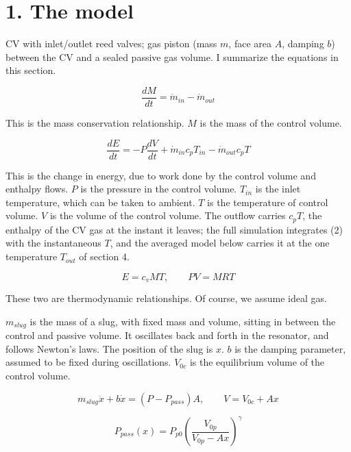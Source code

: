 \documentclass[11pt]{article}
\begin{document}
\section*{1. The model}

CV with inlet/outlet reed valves; gas piston (mass $m$, face area $A$, damping $b$) between the CV and a sealed passive gas volume. I summarize the equations in this section.

\begin{equation}
\frac{dM}{dt} = \dot{m}_{in} - \dot{m}_{out} \tag{1}
\end{equation}

This is the mass conservation relationship. $M$ is the mass of the control volume.

\begin{equation}
\frac{dE}{dt} = -P\frac{dV}{dt} + \dot{m}_{in}c_pT_{in} - \dot{m}_{out}c_pT \tag{2}
\end{equation}

This is the change in energy, due to work done by the control volume and enthalpy flows. $P$ is the pressure in the control volume. $T_{in}$ is the inlet temperature, which can be taken to ambient. $T$ is the temperature of control volume. $V$ is the volume of the control volume. The outflow carries $c_pT$, the enthalpy of the CV gas at the instant it leaves; the full simulation integrates (2) with the instantaneous $T$, and the averaged model below carries it at the one temperature $T_{out}$ of section 4.

\begin{equation}
E = c_vMT, \qquad PV = MRT \tag{3}
\end{equation}

These two are thermodynamic relationships. Of course, we assume ideal gas.

$m_{slug}$ is the mass of a slug, with fixed mass and volume, sitting in between the control and passive volume. It oscillates back and forth in the resonator, and follows Newton's laws. The position of the slug is $x$. $b$ is the damping parameter, assumed to be fixed during oscillations. $V_{0c}$ is the equilibrium volume of the control volume.

\begin{equation}
m_{slug}\ddot x + b\dot x = (P - P_{pass})A, \qquad V = V_{0c} + Ax \tag{4}
\end{equation}

\begin{equation}
P_{pass}(x) = P_{p0}\left(\frac{V_{0p}}{V_{0p} - Ax}\right)^{\gamma} \tag{5}
\end{equation}
\end{document}
